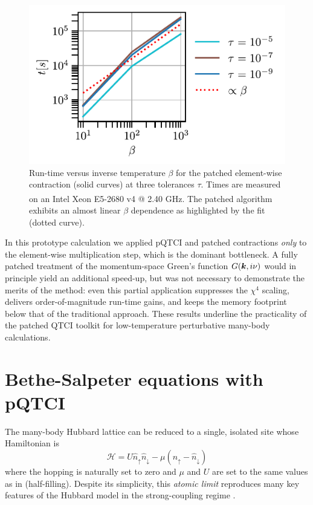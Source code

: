 \begin{figure}[htpb]
    \centering
    \includegraphics{figures/betaScalingBubble.pdf}
    \caption{Run-time versus inverse temperature \(\beta\) for the patched
    element-wise contraction (solid curves) at three tolerances \(\tau\). Times are measured on an Intel\textsuperscript{\textregistered} Xeon\textsuperscript{\textregistered} E5-2680 v4 @ 2.40 GHz.  The patched algorithm exhibits an almost linear \(\beta\) dependence as highlighted by the fit (dotted curve).}
    \label{fig:betaScaling}
\end{figure}

In this prototype calculation we applied pQTCI and patched contractions \emph{only} to the element-wise multiplication step, which is the dominant bottleneck.
A fully patched treatment of the momentum-space Green’s function \(G(\boldsymbol{k},i\nu)\) would in principle yield an additional speed-up, but was not necessary to demonstrate the merits of the method: even this partial application suppresses the \(\chi^{4}\) scaling, delivers
order-of-magnitude run-time gains, and keeps the memory footprint below that of the traditional approach. These results underline the practicality of the patched QTCI
toolkit for low-temperature perturbative many-body calculations.

\section{Bethe-Salpeter equations with pQTCI} 
\label{sec:patchBSE}
The many-body Hubbard lattice can be reduced to a single, isolated site whose Hamiltonian is
\begin{equation}
    \mathcal{H} = U\hat{n}_{\uparrow}\hat{n}_{\downarrow} - \mu(\hat{n}_{\uparrow} - \hat{n}_{\downarrow})
\end{equation}
where the hopping is naturally set to zero and $\mu$ and $U$ are set to the same values as in  (half-filling). Despite its simplicity, this \emph{atomic limit} reproduces many key features of the Hubbard model in the strong-coupling regime \cite{Thunstrom2018}.

